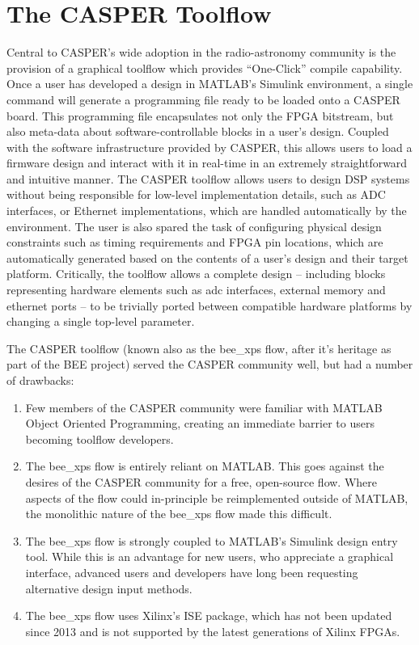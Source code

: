\documentclass{ws-jai}
\begin{document}
\section{The CASPER Toolflow} \label{sec:toolflow}

Central to CASPER's wide adoption in the radio-astronomy community is the provision of a graphical toolflow which provides ``One-Click'' compile capability. Once a user has developed a design in MATLAB's Simulink environment, a single command will generate a programming file ready to be loaded onto a CASPER board. This programming file encapsulates not only the FPGA bitstream, but also meta-data about software-controllable blocks in a user's design. Coupled with the software infrastructure provided by CASPER, this allows users to load a firmware design and interact with it in real-time in an extremely straightforward and intuitive manner.
The CASPER toolflow allows users to design DSP systems without being responsible for low-level implementation details, such as ADC interfaces, or Ethernet implementations, which are handled automatically by the environment. The user is also spared the task of configuring physical design constraints such as timing requirements and FPGA pin locations, which are automatically generated based on the contents of a user's design and their target platform. Critically, the toolflow allows a complete design -- including blocks representing hardware elements such as adc interfaces, external memory and ethernet ports -- to be trivially ported between compatible hardware platforms by changing a single top-level parameter.

The CASPER toolflow (known also as the bee\_xps flow, after it's heritage as part of the BEE project) served the CASPER community well, but had a number of drawbacks:
\begin{enumerate}
 \item Few members of the CASPER community were familiar with MATLAB Object Oriented Programming, creating an immediate barrier to users becoming toolflow developers.
 \item The bee\_xps flow is entirely reliant on MATLAB. This goes against the desires of the CASPER community for a free, open-source flow. Where aspects of the flow could in-principle be reimplemented outside of MATLAB, the monolithic nature of the bee\_xps flow made this difficult.
 \item The bee\_xps flow is strongly coupled to MATLAB's Simulink design entry tool. While this is an advantage for new users, who appreciate a graphical interface, advanced users and developers have long been requesting alternative design input methods.
 \item The bee\_xps flow uses Xilinx's ISE package, which has not been updated since 2013 and is not supported by the latest generations of Xilinx FPGAs.
\end{enumerate}
\end{document}
